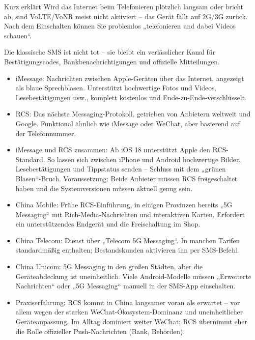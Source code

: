 \begin{tcbinfo}{Kurz erklärt}
Wird das Internet beim Telefonieren plötzlich langsam oder bricht ab, sind VoLTE/VoNR meist nicht aktiviert – das Gerät fällt auf 2G/3G zurück. Nach dem Einschalten können Sie problemlos „telefonieren und dabei Videos schauen“.

\end{tcbinfo}


Die klassische SMS ist nicht tot – sie bleibt ein verlässlicher Kanal für Bestätigungscodes, Bankbenachrichtigungen und offizielle Mitteilungen.

\begin{itemize}
  \item iMessage: Nachrichten zwischen Apple-Geräten über das Internet, angezeigt als blaue Sprechblasen. Unterstützt hochwertige Fotos und Videos, Lesebestätigungen usw., komplett kostenlos und Ende-zu-Ende-verschlüsselt.
  \item RCS: Das nächste Messaging-Protokoll, getrieben von Anbietern weltweit und Google. Funktional ähnlich wie iMessage oder WeChat, aber basierend auf der Telefonnummer.
  \item iMessage und RCS zusammen: Ab iOS 18 unterstützt Apple den RCS-Standard. So lassen sich zwischen iPhone und Android hochwertige Bilder, Lesebestätigungen und Tippstatus senden – Schluss mit dem „grünen Blasen“-Bruch. Voraussetzung: Beide Anbieter müssen RCS freigeschaltet haben und die Systemversionen müssen aktuell genug sein.
\end{itemize}


\begin{itemize}
  \item China Mobile: Frühe RCS-Einführung, in einigen Provinzen bereits „5G Messaging“ mit Rich-Media-Nachrichten und interaktiven Karten. Erfordert ein unterstützendes Endgerät und die Freischaltung im Shop.
  \item China Telecom: Dienst über „Telecom 5G Messaging“. In manchen Tarifen standardmäßig enthalten; Bestandskunden aktivieren ihn per SMS-Befehl.
  \item China Unicom: 5G Messaging in den großen Städten, aber die Geräteabdeckung ist uneinheitlich. Viele Android-Modelle müssen „Erweiterte Nachrichten“ oder „5G Messaging“ manuell in der SMS-App einschalten.
  \item Praxiserfahrung: RCS kommt in China langsamer voran als erwartet – vor allem wegen der starken WeChat-Ökosystem-Dominanz und uneinheitlicher Geräteanpassung. Im Alltag dominiert weiter WeChat; RCS übernimmt eher die Rolle offizieller Push-Nachrichten (Bank, Behörden).
\end{itemize}

